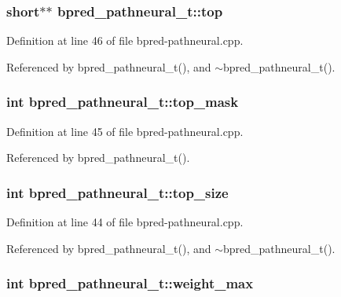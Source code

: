 \subsubsection[{top}]{\setlength{\rightskip}{0pt plus 5cm}short$\ast$$\ast$ {\bf bpred\_\-pathneural\_\-t::top}\hspace{0.3cm}{\tt  [protected]}}\label{classbpred__pathneural__t_5ba0efb5ca04d5068417fb19ba48960c}




Definition at line 46 of file bpred-pathneural.cpp.

Referenced by bpred\_\-pathneural\_\-t(), and $\sim$bpred\_\-pathneural\_\-t().
\subsubsection[{top\_\-mask}]{\setlength{\rightskip}{0pt plus 5cm}int {\bf bpred\_\-pathneural\_\-t::top\_\-mask}\hspace{0.3cm}{\tt  [protected]}}\label{classbpred__pathneural__t_0520005b55ff9ccfb81caff4efdf7b8a}




Definition at line 45 of file bpred-pathneural.cpp.

Referenced by bpred\_\-pathneural\_\-t().
\subsubsection[{top\_\-size}]{\setlength{\rightskip}{0pt plus 5cm}int {\bf bpred\_\-pathneural\_\-t::top\_\-size}\hspace{0.3cm}{\tt  [protected]}}\label{classbpred__pathneural__t_b31653076558d239738c30e3f3803eaf}




Definition at line 44 of file bpred-pathneural.cpp.

Referenced by bpred\_\-pathneural\_\-t(), and $\sim$bpred\_\-pathneural\_\-t().
\subsubsection[{weight\_\-max}]{\setlength{\rightskip}{0pt plus 5cm}int {\bf bpred\_\-pathneural\_\-t::weight\_\-max}\hspace{0.3cm}{\tt  [protected]}}\label{classbpred__pathneural__t_9e4ec522dedd7dfed4502dc297f65339}




